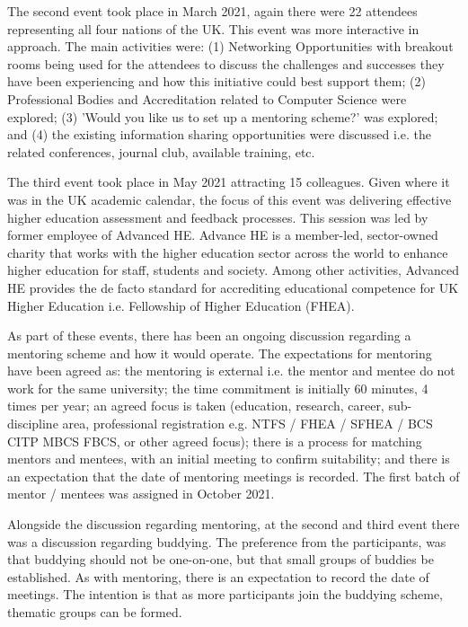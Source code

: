 \documentclass[sigconf]{acmart}
\begin{document}
The second event took place in March 2021, again there were 22 attendees representing all four nations of the UK. This event was more interactive in approach. The main activities were: (1) Networking Opportunities with breakout rooms being used for the attendees to discuss the challenges and successes they have been experiencing and how this initiative could best support them; (2) Professional Bodies and Accreditation related to Computer Science were explored; (3) 'Would you like us to set up a mentoring scheme?' was explored; and (4) the existing information sharing opportunities were discussed i.e. the related conferences, journal club, available training, etc. 

The third event took place in May 2021 attracting 15 colleagues. Given where it was in the UK academic calendar, the focus of this event was delivering effective higher education assessment and feedback processes. This session was led by former employee of Advanced HE. Advance HE is a member-led, sector-owned charity that works with the higher education sector across the world to enhance higher education for staff, students and society. Among other activities, Advanced HE provides the de facto standard for accrediting educational competence for UK Higher Education i.e. Fellowship of Higher Education (FHEA).

As part of these events, there has been an ongoing discussion regarding a mentoring scheme and how it would operate. The expectations for mentoring have been agreed as: the mentoring is external i.e. the mentor and mentee do not work for the same university; the time commitment is initially 60 minutes, 4 times per year; an agreed focus is taken (education, research, career, sub-discipline area, professional registration e.g. NTFS / FHEA / SFHEA / BCS CITP MBCS FBCS, or other agreed focus); there is a process for matching mentors and mentees, with an initial meeting to confirm suitability; and there is an expectation that the date of mentoring meetings is recorded. The first batch of mentor / mentees was assigned in October 2021. 

Alongside the discussion regarding mentoring, at the second and third event there was a discussion regarding buddying. The preference from the participants, was that buddying should not be one-on-one, but that small groups of buddies be established. As with mentoring, there is an expectation to record the date of meetings. The intention is that as more participants join the buddying scheme, thematic groups can be formed. 
\end{document}
